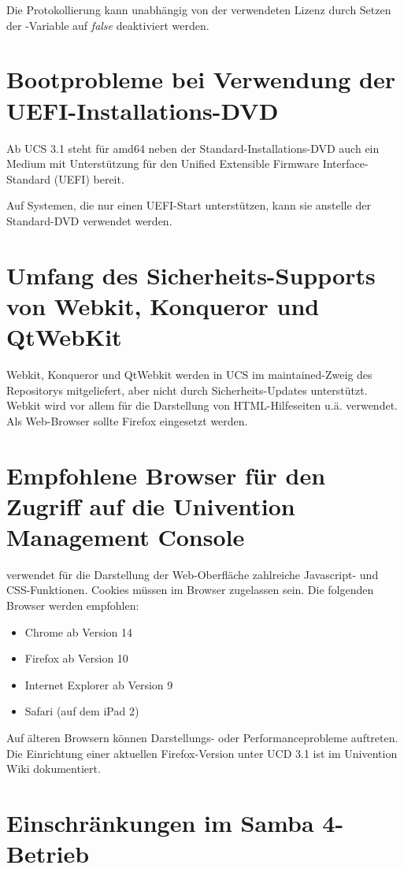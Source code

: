 Die Protokollierung kann unabhängig von der verwendeten Lizenz durch
Setzen der \ucsUCR{}-Variable   auf \emph{false} deaktiviert
werden.

\section{Bootprobleme bei Verwendung der UEFI-Installations-DVD}
Ab UCS 3.1 steht für amd64 neben der Standard-Installations-DVD auch
ein Medium mit Unterstützung für den Unified Extensible Firmware
Interface-Standard (UEFI) bereit.

Auf Systemen, die nur einen UEFI-Start unterstützen, kann sie anstelle
der Standard-DVD verwendet werden.

\section{Umfang des Sicherheits-Supports von Webkit, Konqueror und QtWebKit}
Webkit, Konqueror und QtWebkit werden in UCS im maintained-Zweig des
Repositorys mitgeliefert, aber nicht durch Sicherheits-Updates
unterstützt. Webkit wird vor allem für die Darstellung von
HTML-Hilfeseiten u.ä. verwendet. Als Web-Browser sollte Firefox
eingesetzt werden.

\section{Empfohlene Browser für den Zugriff auf die Univention Management Console}

\ucsUMC{} verwendet für die Darstellung der Web-Oberfläche zahlreiche
Javascript- und CSS-Funktionen. Cookies müssen im Browser zugelassen
sein. Die folgenden Browser werden empfohlen:

\begin{itemize}
\item Chrome ab Version 14
\item Firefox ab Version 10
\item Internet Explorer ab Version 9
\item Safari (auf dem iPad 2)
\end{itemize}

Auf älteren Browsern können Darstellungs- oder Performanceprobleme
auftreten. Die Einrichtung einer aktuellen Firefox-Version unter UCD
3.1 ist im Univention Wiki \cite{ucd-firefox7} dokumentiert.

\section{Einschränkungen im Samba 4-Betrieb}


